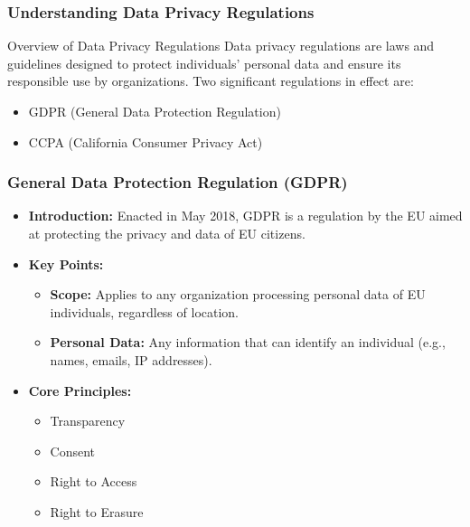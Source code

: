 \documentclass{beamer}
\begin{document}
\begin{frame}[fragile]
    \frametitle{Understanding Data Privacy Regulations}
    \begin{block}{Overview of Data Privacy Regulations}
        Data privacy regulations are laws and guidelines designed to protect individuals' personal data and ensure its responsible use by organizations.
        Two significant regulations in effect are:
        \begin{itemize}
            \item GDPR (General Data Protection Regulation)
            \item CCPA (California Consumer Privacy Act)
        \end{itemize}
    \end{block}
\end{frame}

\begin{frame}[fragile]
    \frametitle{General Data Protection Regulation (GDPR)}
    \begin{itemize}
        \item \textbf{Introduction:} Enacted in May 2018, GDPR is a regulation by the EU aimed at protecting the privacy and data of EU citizens.
        \item \textbf{Key Points:}
        \begin{itemize}
            \item \textbf{Scope:} Applies to any organization processing personal data of EU individuals, regardless of location.
            \item \textbf{Personal Data:} Any information that can identify an individual (e.g., names, emails, IP addresses).
        \end{itemize}
        \item \textbf{Core Principles:}
        \begin{itemize}
            \item Transparency
            \item Consent
            \item Right to Access
            \item Right to Erasure
        \end{itemize}
    \end{itemize}
\end{frame}
\end{document}
